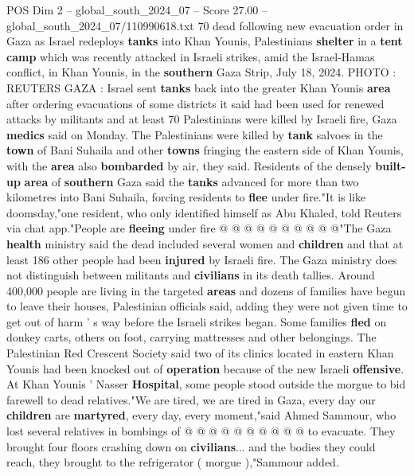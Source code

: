 \begin{textsample}{POS Dim 2 – global\_south\_2024\_07 – Score 27.00 – global\_south\_2024\_07/110990618.txt}  \label{ex:f2_pos_162}
70 dead following new evacuation order in Gaza as Israel redeploys \textbf{tanks} into Khan Younis, Palestinians \textbf{shelter} in a \textbf{tent} \textbf{camp} which was recently attacked in Israeli strikes, amid the Israel-Hamas conflict, in Khan Younis, in the \textbf{southern} Gaza Strip, July 18, 2024.
PHOTO : REUTERS GAZA : Israel sent \textbf{tanks} back into the greater Khan Younis \textbf{area} after ordering evacuations of some districts it said had been used for renewed attacks by militants and at least 70 Palestinians were killed by Israeli fire, Gaza \textbf{medics} said on Monday.
The Palestinians were killed by \textbf{tank} salvoes in the \textbf{town} of Bani Suhaila and other \textbf{towns} fringing the eastern side of Khan Younis, with the \textbf{area} also \textbf{bombarded} by air, they said.
Residents of the densely \textbf{built-up} \textbf{area} of \textbf{southern} Gaza said the \textbf{tanks} advanced for more than two kilometres into Bani Suhaila, forcing residents to \textbf{flee} under fire."It is like doomsday,"one resident, who only identified himself as Abu Khaled, told Reuters via chat app."People are \textbf{fleeing} under fire @ @ @ @ @ @ @ @ @ @"The Gaza \textbf{health} ministry said the dead included several women and \textbf{children} and that at least 186 other people had been \textbf{injured} by Israeli fire.
The Gaza ministry does not distinguish between militants and \textbf{civilians} in its death tallies.
Around 400,000 people are living in the targeted \textbf{areas} and dozens of families have begun to leave their houses, Palestinian officials said, adding they were not given time to get out of harm ' s way before the Israeli strikes began.
Some families \textbf{fled} on donkey carts, others on foot, carrying mattresses and other belongings.
The Palestinian Red Crescent Society said two of its clinics located in eastern Khan Younis had been knocked out of \textbf{operation} because of the new Israeli \textbf{offensive}.
At Khan Younis ' Nasser \textbf{Hospital}, some people stood outside the morgue to bid farewell to dead relatives."We are tired, we are tired in Gaza, every day our \textbf{children} are \textbf{martyred}, every day, every moment,"said Ahmed Sammour, who lost several relatives in bombings of @ @ @ @ @ @ @ @ @ @ to evacuate.
They brought four floors crashing down on \textbf{civilians}... and the bodies they could reach, they brought to the refrigerator ( morgue ),"Sammour added.

\end{textsample}
